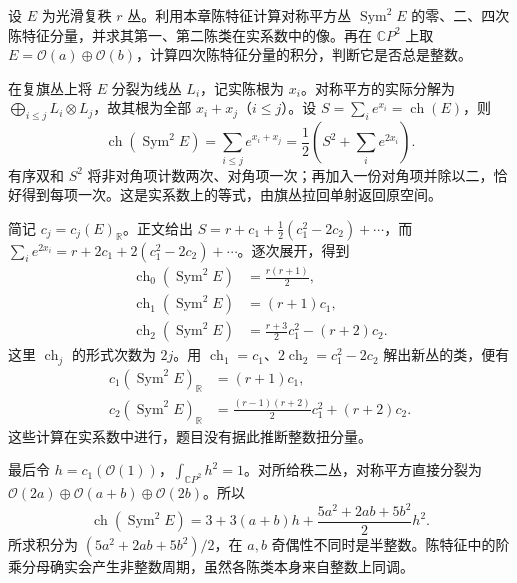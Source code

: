 \begin{exercise}\label{g2:ex:chern-character-symmetric-square}
	设 \(E\) 为光滑复秩 \(r\) 丛。利用本章陈特征计算对称平方丛 \(\operatorname{Sym}^2E\) 的零、二、四次陈特征分量，并求其第一、第二陈类在实系数中的像。再在 \(\mathbb CP^2\) 上取 \(E=\mathcal O(a)\oplus\mathcal O(b)\)，计算四次陈特征分量的积分，判断它是否总是整数。
\end{exercise}
\begin{solution}
	在复旗丛上将 \(E\) 分裂为线丛 \(L_i\)，记实陈根为 \(x_i\)。对称平方的实际分解为 \(\bigoplus_{i\le j}L_i\otimes L_j\)，故其根为全部 \(x_i+x_j\)（\(i\le j\)）。设 \(S=\sum_i e^{x_i}=\operatorname{ch}(E)\)，则
	\[
		\operatorname{ch}(\operatorname{Sym}^2E)
		=\sum_{i\le j}e^{x_i+x_j}
		=\frac12\left(S^2+\sum_i e^{2x_i}\right).
	\]
	有序双和 \(S^2\) 将非对角项计数两次、对角项一次；再加入一份对角项并除以二，恰好得到每项一次。这是实系数上的等式，由旗丛拉回单射返回原空间。

	简记 \(c_j=c_j(E)_{\mathbb R}\)。正文给出 \(S=r+c_1+\frac12(c_1^2-2c_2)+\cdots\)，而 \(\sum_i e^{2x_i}=r+2c_1+2(c_1^2-2c_2)+\cdots\)。逐次展开，得到
	\[
	\begin{aligned}
		\operatorname{ch}_0(\operatorname{Sym}^2E)&=\frac{r(r+1)}2,\\
		\operatorname{ch}_1(\operatorname{Sym}^2E)&=(r+1)c_1,\\
		\operatorname{ch}_2(\operatorname{Sym}^2E)&=\frac{r+3}{2}c_1^2-(r+2)c_2.
	\end{aligned}
	\]
	这里 \(\operatorname{ch}_j\) 的形式次数为 \(2j\)。用 \(\operatorname{ch}_1=c_1\)、\(2\operatorname{ch}_2=c_1^2-2c_2\) 解出新丛的类，便有
	\[
	\begin{aligned}
		c_1(\operatorname{Sym}^2E)_{\mathbb R}&=(r+1)c_1,\\
		c_2(\operatorname{Sym}^2E)_{\mathbb R}&=\frac{(r-1)(r+2)}2c_1^2+(r+2)c_2.
	\end{aligned}
	\]
	这些计算在实系数中进行，题目没有据此推断整数扭分量。

	最后令 \(h=c_1(\mathcal O(1))\)，\(\int_{\mathbb CP^2}h^2=1\)。对所给秩二丛，对称平方直接分裂为 \(\mathcal O(2a)\oplus\mathcal O(a+b)\oplus\mathcal O(2b)\)。所以
	\[
		\operatorname{ch}(\operatorname{Sym}^2E)
		=3+3(a+b)h+\frac{5a^2+2ab+5b^2}{2}h^2.
	\]
	所求积分为 \((5a^2+2ab+5b^2)/2\)，在 \(a,b\) 奇偶性不同时是半整数。陈特征中的阶乘分母确实会产生非整数周期，虽然各陈类本身来自整数上同调。
\end{solution}

